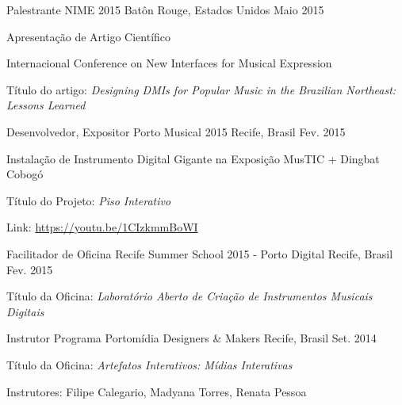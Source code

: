 


\begin{cventries}
\cventry
	{Palestrante}
	{NIME 2015}
	{Batôn Rouge, Estados Unidos}
	{Maio 2015}
	{\begin{cvitems}
		\item{Apresentação de Artigo Científico}
		\item{Internacional Conference on New Interfaces for Musical Expression}
		\item{Título do artigo: \textit{Designing DMIs for Popular Music in the Brazilian Northeast: Lessons Learned}}
	\end{cvitems}}

\cventry
	{Desenvolvedor, Expositor}
	{Porto Musical 2015}
	{Recife, Brasil}
	{Fev. 2015}
	{\begin{cvitems}
		\item{Instalação de Instrumento Digital Gigante na Exposição MusTIC + Dingbat Cobogó}
		\item{Título do Projeto: \textit{Piso Interativo}}
		\item{Link: \href{https://youtu.be/1CIzkmmBoWI}{https://youtu.be/1CIzkmmBoWI}}
	\end{cvitems}}

\cventry
	{Facilitador de Oficina}
	{Recife Summer School 2015 - Porto Digital}
	{Recife, Brasil}
	{Fev. 2015}
	{\begin{cvitems}
		\item{Título da Oficina: \textit{Laboratório Aberto de Criação de Instrumentos Musicais Digitais}}
	\end{cvitems}}

\cventry
	{Instrutor}
	{Programa Portomídia Designers \& Makers}
	{Recife, Brasil}
	{Set. 2014}
	{\begin{cvitems}
		\item{Título da Oficina: \textit{Artefatos Interativos: Mídias Interativas}}
		\item{Instrutores: Filipe Calegario, Madyana Torres, Renata Pessoa}
	\end{cvitems}}


\end{cventries}
